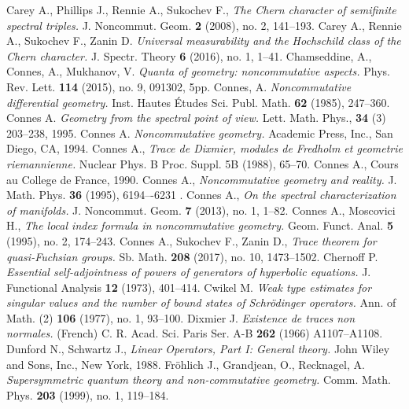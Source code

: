 \begin{thebibliography}{99}
 Carey A., Phillips J., Rennie A., Sukochev F., {\it The Chern character of semifinite spectral triples.} J. Noncommut. Geom. {\bf 2} (2008), no. 2, 141--193.
 Carey A., Rennie A., Sukochev F., Zanin D. {\it Universal measurability and the Hochschild class of the Chern character.} J. Spectr. Theory {\bf 6} (2016), no. 1, 1--41.
 Chamseddine, A., Connes, A., Mukhanov, V. {\it Quanta of geometry: noncommutative aspects.} Phys. Rev. Lett. {\bf 114} (2015), no. 9, 091302, 5pp.
 Connes, A. {\it Noncommutative differential geometry.} Inst. Hautes \'Etudes Sci. Publ. Math. {\bf 62} (1985), 247--360.
 Connes A. {\it Geometry from the spectral point of view.} Lett. Math. Phys., {\bf 34} (3) 203--238, 1995.
 Connes A. {\it Noncommutative geometry.} Academic Press, Inc., San Diego, CA, 1994.
 Connes A., {\it Trace de Dixmier, modules de Fredholm et geometrie riemannienne.} Nuclear Phys. B Proc. Suppl. 5B (1988), 65--70.
 Connes A., Cours au College de France, 1990.
 Connes A., {\it Noncommutative geometry and reality.} J. Math. Phys. {\bf 36} (1995), 6194–-6231 .
 Connes A., {\it On the spectral characterization of manifolds.} J. Noncommut. Geom. {\bf 7} (2013), no. 1, 1--82.
 Connes A., Moscovici H., {\it The local index formula in noncommutative geometry.} Geom. Funct. Anal. {\bf 5} (1995), no. 2, 174--243.
 Connes A., Sukochev F., Zanin D., {\it Trace theorem for quasi-Fuchsian groups.} Sb. Math. {\bf 208} (2017), no. 10, 1473--1502.
  Chernoff P. {\it Essential self-adjointness of powers of generators of hyperbolic equations.} J. Functional Analysis {\bf 12} (1973), 401--414.
 Cwikel M. {\it Weak type estimates for singular values and the number of bound states of Schr\"odinger operators.} Ann. of Math. (2) {\bf 106} (1977), no. 1, 93--100.
 Dixmier J. {\it Existence de traces non normales.} (French)  C. R. Acad. Sci. Paris Ser. A-B  {\bf 262}  (1966) A1107--A1108.
 Dunford N., Schwartz J., {\it Linear Operators, Part I: General theory.} John Wiley and Sons, Inc., New York, 1988.
 Fr\"ohlich J., Grandjean, O., Recknagel, A. {\it Supersymmetric quantum theory and non-commutative geometry.} Comm. Math. Phys. {\bf 203} (1999), no. 1, 119--184.

\end{thebibliography}
